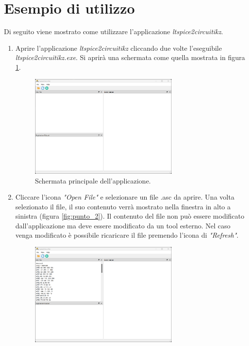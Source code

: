 \clearpage

\section{Esempio di utilizzo}
Di seguito viene mostrato come utilizzare l'applicazione \textit{ltspice2circuitikz}. 
\begin{enumerate}
	\item Aprire l'applicazione \textit{ltspice2circuitikz} cliccando due volte l'eseguibile \textit{ltspice2circuitikz.exe}. Si aprirà una schermata come quella mostrata in figura \ref{fig:punto_1}.
	\begin{figure}[h!]
		\centering
		\includegraphics[width=0.7\textwidth]{./ImageFiles/mainview.png}
		\caption{Schermata principale dell'applicazione.}
		\label{fig:punto_1}
	\end{figure}
	\item Cliccare l'icona \textit{"Open File"} e selezionare un file .asc da aprire. Una volta selezionato il file, il suo contenuto verrà mostrato nella finestra in alto a sinistra (figura \ref{fig:punto_2}). Il contenuto del file non può essere modificato dall'applicazione ma deve essere modificato da un tool esterno. Nel caso venga modificato è possibile ricaricare il file premendo l'icona di \textit{"Refresh"}.
	\begin{figure}[h!]
		\centering
		\includegraphics[width=0.7\textwidth]{./ImageFiles/file aperto.png}

\end{figure}
\end{enumerate}
